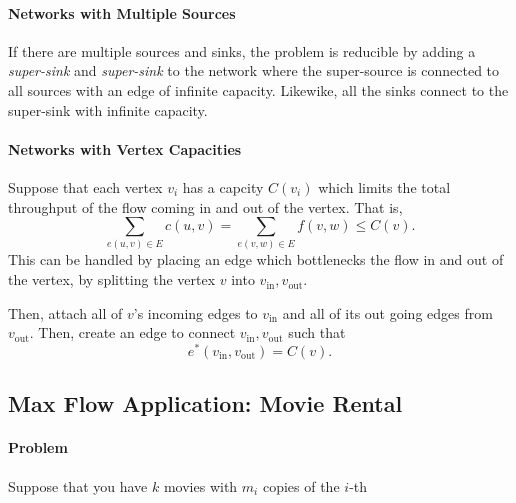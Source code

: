 \paragraph{Networks with Multiple Sources}
If there are multiple sources and sinks, the problem is reducible by
adding a \textit{super-sink} and \textit{super-sink} to the network
where the super-source is connected to all sources with an edge of infinite
capacity. Likewike, all the sinks connect to the super-sink with infinite
capacity.

\paragraph{Networks with Vertex Capacities}
Suppose that each vertex \(v_i\) has a capcity \(C(v_i)\) which limits the total
throughput of the flow coming in and out of the vertex.
That is, \[
  \sum_{e(u, v) \in E} c(u, v) = \sum_{e(v, w)\in E}f(v, w) \leq C(v)
.\] 
This can be handled by placing an edge which bottlenecks the flow in and out of
the vertex, by splitting the vertex \(v\) into  \(v_{\mathrm{in}}, v_{\mathrm{out}}\).

Then, attach all of \(v\)'s incoming edges to \(v_{\mathrm{in}}\) and all of
its out going edges from  \(v_{\mathrm{out}}\).
Then, create an edge to connect  \(v_{\mathrm{in}}, v_{\mathrm{out}}\) such that  \[
  e^*(v_{\mathrm{in}}, v_{\mathrm{out}}) = C(v)
.\] 

\subsection{Max Flow Application: Movie Rental}

\paragraph{Problem}
Suppose that you have \(k\) movies with  \(m_i\) copies of the \(i\)-th 


